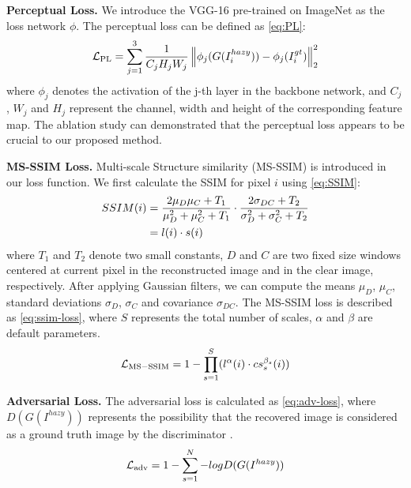 \documentclass[10pt,twocolumn,letterpaper]{article}
\begin{document}
\textbf{Perceptual Loss.} We introduce the VGG-16 \cite{VGG-16} pre-trained on ImageNet as the loss network $\phi$. The perceptual loss can be defined as \cref{eq:PL}:
\begin{equation}
\setlength\abovedisplayskip{0pt}%
\setlength\belowdisplayskip{0pt}
  \mathcal{L}_{\rm PL}= \sum_{j=1}^3 \frac{1}{C_jH_jW_j}\left\| \phi_j(G(I_{i}^{hazy}))-\phi_j(I_{i}^{gt}) \right\|_2^2
  \label{eq:PL}
\end{equation}
where $\phi_j$ denotes the activation of the j-th layer in the backbone network, and $C_j$, $W_j$ and $H_j$ represent the channel, width and height of the corresponding feature map.
The ablation study can demonstrated that the perceptual loss appears to be crucial to our proposed method.

\textbf{MS-SSIM Loss.} Multi-scale Structure similarity (MS-SSIM) \cite{DW-GAN} is introduced in our loss function. We first calculate the SSIM for pixel $i$ using \cref{eq:SSIM}:
\begin{equation}
\setlength\abovedisplayskip{0pt}%
\setlength\belowdisplayskip{0pt}
\begin{split}
   SSIM(i)&= \frac{2\mu_D\mu_C+T_1}{\mu_D^2+\mu_C^2+T_1}\cdot\frac{2\sigma_{DC}+T_2}{\sigma_D^2+\sigma_C^2+T_2}\\
  &=l(i)\cdot s(i)
  \label{eq:SSIM}
\end{split}  
\end{equation}
where $T_1$ and $T_2$ denote two small constants, $D$ and $C$ are two fixed size windows centered at current pixel in the reconstructed image and in the clear image, respectively. After applying Gaussian filters, we can compute the means $\mu_D$, $\mu_C$, standard deviations $\sigma_D$, $\sigma_C$ and covariance $\sigma_{DC}$. The MS-SSIM loss is described as \cref{eq:ssim-loss}, where $S$ represents the total number of scales, $\alpha$ and $\beta$ are default parameters.
\begin{equation}
\setlength\abovedisplayskip{0pt}%
\setlength\belowdisplayskip{0pt}
\mathcal{L}_{\rm MS-SSIM}=1-\prod_{s=1}^S (l^{\alpha}(i) \cdot cs_s^{\beta_s}(i))
\label{eq:ssim-loss}  
\end{equation}

\textbf{Adversarial Loss.} The adversarial loss is calculated as \cref{eq:adv-loss}, where $D(G(I^{hazy}))$ represents the possibility that the recovered image is considered as a ground truth image by the discriminator \cite{GAN}.
\begin{equation}
\setlength\abovedisplayskip{0pt}%
\setlength\belowdisplayskip{0pt}
  \mathcal{L}_{\rm adv}=1-\sum_{s=1}^N -log D(G(I^{hazy}))
  \label{eq:adv-loss}  
\end{equation}
\end{document}
